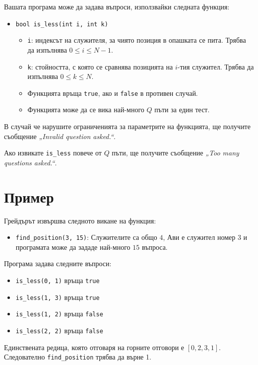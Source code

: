 \documentclass[a4paper,11pt]{article}
\newcommand{\code}[1]{\texttt{#1}}
\newcommand{\noskip}{\vspace{-\parskip}}
\begin{document}
Вашата програма може да задава въпроси, използвайки следната функция:
\noskip
\begin{itemize}
    \item \code{bool is\_less(int i, int k)}
    \begin{itemize}
        \item \code{i}: индексът на служителя, за чиято позиция в опашката се
            пита.
            Трябва да изпълнява $0 \leq i \leq N-1$.
        \item \code{k}: стойността, с която се сравнява позицията на $i$-тия
            служител.
            Трябва да изпълнява $0 \leq k \leq N$.
        \item Функцията връща \code{true}, ако  и \code{false} в противен случай.
        \item Функцията може да се вика най-много $Q$ пъти за един тест.
    \end{itemize}
\end{itemize}

В случай че нарушите ограниченията за параметрите на функцията, ще получите
съобщение \textit{„Invalid question asked.“}.

Ако извикате \code{is\_less} повече от $Q$ пъти, ще получите съобщение 
\textit{„Too many questions asked.“}.

\section*{Пример}
Грейдърът извършва следното викане на функция:
\noskip
\begin{itemize}
    \item \code{find\_position(3, 15)}: Служителите са общо $4$, Ави е служител
        номер $3$ и програмата може да зададе най-много $15$ въпроса.
\end{itemize}

Програма задава следните въпроси:
\noskip
\begin{itemize}
    \item \code{is\_less(0, 1)} връща \code{true}
    \item \code{is\_less(1, 3)} връща \code{true}
    \item \code{is\_less(1, 2)} връща \code{false}
    \item \code{is\_less(2, 2)} връща \code{false}
\end{itemize}
Единствената редица, която отговаря на горните отговори е $[0, 2, 3, 1]$.
Следователно \code{find\_position} трябва да върне 1.
\end{document}
